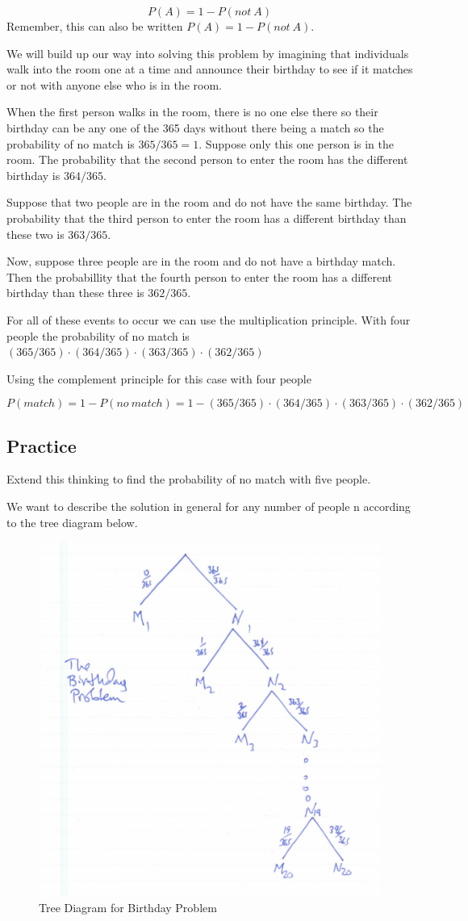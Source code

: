 \documentclass[]{book}
\theoremstyle{definition}
\theoremstyle{definition}
\theoremstyle{definition}
\theoremstyle{remark}
\begin{document}
\[P(A)= 1-P(not \ A)\] Remember, this can also be written
\(P(A)=1-P(not \ A)\).

We will build up our way into solving this problem by imagining that
individuals walk into the room one at a time and announce their birthday
to see if it matches or not with anyone else who is in the room.

When the first person walks in the room, there is no one else there so
their birthday can be any one of the 365 days without there being a
match so the probability of no match is \(365/365=1\). Suppose only this
one person is in the room. The probability that the second person to
enter the room has the different birthday is \(364/365\).

Suppose that two people are in the room and do not have the same
birthday. The probability that the third person to enter the room has a
different birthday than these two is \(363/365\).

Now, suppose three people are in the room and do not have a birthday
match. Then the probabillity that the fourth person to enter the room
has a different birthday than these three is \(362/365\).

For all of these events to occur we can use the multiplication
principle. With four people the probability of no match is
\((365/365) \cdot (364/365) \cdot (363/365) \cdot (362/365)\)

Using the complement principle for this case with four people

\[P(match)=1-P(no \ match)=1-(365/365) \cdot (364/365) \cdot (363/365) \cdot (362/365)\]

\subsection{Practice}\label{practice-4}

Extend this thinking to find the probability of no match with five
people.

We want to describe the solution in general for any number of people n
according to the tree diagram below.

\begin{figure}

{\centering \includegraphics[width=0.3\linewidth]{01-basics-figures/birthday_problem_tree_diagram} 

}

\caption{Tree Diagram for Birthday Problem}\label{fig:nice-fig-65}
\end{figure}
\end{document}
